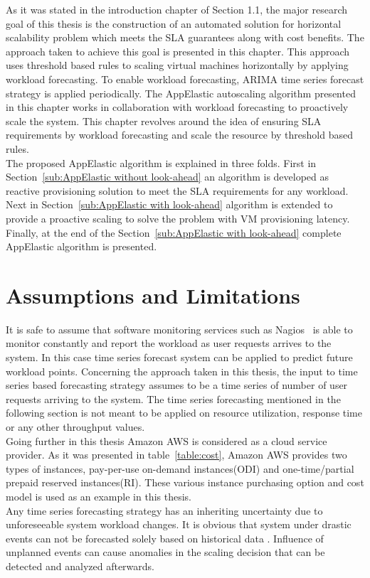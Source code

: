 As it was stated in the introduction chapter of Section 1.1, the major research goal of this thesis is the construction of an automated solution for horizontal scalability problem which meets the SLA guarantees along with cost benefits. The approach taken to achieve this goal is presented in this chapter. This approach uses threshold based rules to scaling virtual machines horizontally by applying workload forecasting. To enable workload forecasting, ARIMA time series forecast strategy is applied periodically. The AppElastic autoscaling algorithm presented in this chapter works in collaboration with workload forecasting to proactively scale the system. This chapter revolves around the idea of ensuring SLA requirements by workload forecasting and scale the resource by threshold based rules.
\\
The proposed AppElastic algorithm is explained in three folds. First in Section~\ref{sub:AppElastic without look-ahead} an algorithm is developed as reactive provisioning solution to meet the SLA requirements for any workload. Next in Section~\ref{sub:AppElastic with look-ahead} algorithm is extended to provide a proactive scaling to solve the problem with VM provisioning latency. Finally, at the end of the Section~\ref{sub:AppElastic with look-ahead} complete AppElastic algorithm is presented.
\section{Assumptions and Limitations}
\label{sec:Assumptions and Limitations}
It is safe to assume that software monitoring services  such as Nagios~\cite{josephsen2007building} is able to monitor constantly and report the workload as user requests arrives to the system. In this case time series forecast system can be applied to predict future workload points. Concerning the approach taken in this thesis, the input to time series based forecasting strategy assumes to be a time series of number of user requests arriving to the system. The time series forecasting mentioned in the following section is not meant to be applied on resource utilization, response time or any other throughput values.
\\
Going further in this thesis Amazon AWS is considered as a cloud service provider. As it was presented in table~\ref{table:cost}, Amazon AWS provides two types of instances, pay-per-use on-demand instances(ODI) and one-time/partial prepaid reserved instances(RI). These various instance purchasing option and cost model is used as an example in this thesis.
\\
Any time series forecasting strategy has an inheriting uncertainty due to unforeseeable system workload changes. It is obvious that system under drastic events can not be forecasted solely based on historical data \cite{herbst2012workload}. Influence of unplanned events can cause anomalies in the scaling decision that can be detected and analyzed afterwards.

